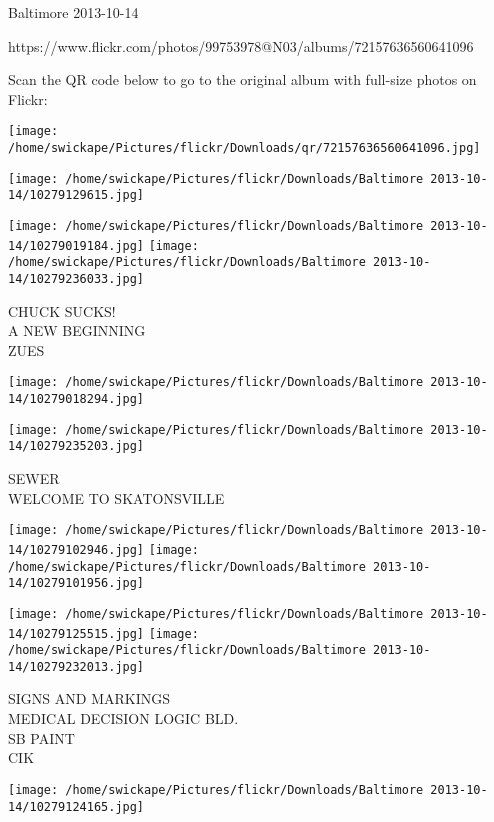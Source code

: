 \documentclass[10pt,letterpaper]{article}
\begin{document}
Baltimore 2013-10-14

https://www.flickr.com/photos/99753978@N03/albums/72157636560641096

Scan the QR code below to go to the original album with full-size photos on Flickr:

\texttt{[image: /home/swickape/Pictures/flickr/Downloads/qr/72157636560641096.jpg]}
\pagebreak

\texttt{[image: /home/swickape/Pictures/flickr/Downloads/Baltimore 2013-10-14/10279129615.jpg]}

\vspace{0.25in}
\texttt{[image: /home/swickape/Pictures/flickr/Downloads/Baltimore 2013-10-14/10279019184.jpg]}
\texttt{[image: /home/swickape/Pictures/flickr/Downloads/Baltimore 2013-10-14/10279236033.jpg]}

CHUCK SUCKS!\\
A NEW BEGINNING\\
ZUES\\
\pagebreak

\texttt{[image: /home/swickape/Pictures/flickr/Downloads/Baltimore 2013-10-14/10279018294.jpg]}

\vspace{0.25in}
\texttt{[image: /home/swickape/Pictures/flickr/Downloads/Baltimore 2013-10-14/10279235203.jpg]}

SEWER\\
WELCOME TO SKATONSVILLE\\
\pagebreak

\texttt{[image: /home/swickape/Pictures/flickr/Downloads/Baltimore 2013-10-14/10279102946.jpg]}
\texttt{[image: /home/swickape/Pictures/flickr/Downloads/Baltimore 2013-10-14/10279101956.jpg]}

\texttt{[image: /home/swickape/Pictures/flickr/Downloads/Baltimore 2013-10-14/10279125515.jpg]}
\texttt{[image: /home/swickape/Pictures/flickr/Downloads/Baltimore 2013-10-14/10279232013.jpg]}

SIGNS AND MARKINGS\\
MEDICAL DECISION LOGIC BLD.\\
SB PAINT\\
CIK\\
\pagebreak

\texttt{[image: /home/swickape/Pictures/flickr/Downloads/Baltimore 2013-10-14/10279124165.jpg]}
\end{document}
